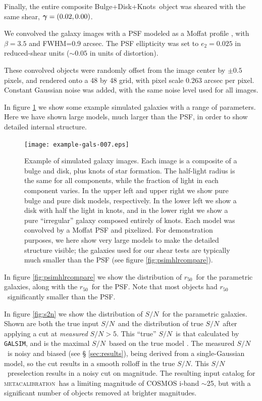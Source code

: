 \documentclass[iop, twocolappendix, appendixfloats, numberedappendix, apj]{emulateapj}
\newcommand{\snr}{$S/N$}
\newcommand{\hlr}{$r_{50}$}
\newcommand{\vecg}{\mbox{\boldmath $\gamma$}}
\newcommand{\mcal}{\textsc{metacalibration}}
\newcommand{\bdkfull}{Bulge+Disk+Knots}
\newcommand{\galsim}{\texttt{GALSIM}}
\begin{document}
Finally, the entire composite \bdkfull\ object was sheared with the same
shear, $\vecg = (0.02, 0.00)$.

We convolved the galaxy images with a PSF modeled as a Moffat profile
\citep{Moffat1969}, with $\beta=3.5$ and FWHM=0.9 arcsec. The PSF ellipticity
was set to $e_2 = 0.025$ in reduced-shear units ($\sim0.05$ in units of
distortion). 

These convolved objects were randomly offset from the image center by $\pm 0.5$
pixels, and rendered onto a 48 by 48 grid, with pixel scale 0.263 arcsec per
pixel. Constant Gaussian noise was added, with the same noise level used for
all images. 

In figure \ref{fig:parametricgals} we show some example simulated galaxies with
a range of parameters.  Here we have shown large models, much larger than the
PSF, in order to show detailed internal structure.

\begin{figure}[p]
    \centering
    \texttt{[image: example-gals-007.eps]}

    \caption{Example of simulated galaxy images.  Each image is a composite of a
    bulge and disk, plus knots of star formation.  The half-light radius is the
    same for all components, while the fraction of light in each component
    varies.  In the upper left and upper right we show pure bulge and pure disk
    models, respectively.  In the lower left we show a disk with half the light
    in knots, and in the lower right we show a pure ``irregular'' galaxy
    composed entirely of knots.  Each model was convolved by a Moffat PSF
	and pixelized.  For demonstration purposes, we here show very
    large models to make the detailed structure visible; the galaxies used for
    our shear tests are typically much smaller than the PSF (see figure
	\ref{fig:psimhlrcompare}). }

	\label{fig:parametricgals}

\end{figure}

In figure \ref{fig:psimhlrcompare} we show the distribution of \hlr\ for the
parametric galaxies, along with the \hlr\ for the PSF.  Note that most objects
had \hlr\ significantly smaller than the PSF.

In figure \ref{fig:s2n} we show the distribution of \snr\ for the parametric
galaxies.   Shown are both the true input \snr\ and the distribution of true
\snr\ after applying a cut at {\it measured} \snr$ > 5$.  This ``true'' \snr\
is that calculated by \galsim, and is the maximal \snr\ based on the true model
\citep{Jarvis2016}.  The measured \snr\ is noisy and biased (see \S
\ref{sec:results}), being derived from a single-Gaussian model, so the cut
results in a smooth rolloff in the true \snr.  This \snr\ preselection results
in a noisy cut on magnitude.  The resulting input catalog for \mcal\ has a
limiting magnitude of COSMOS i-band $\sim$25, but with a significant number
of objects removed at brighter magnitudes.
\end{document}
